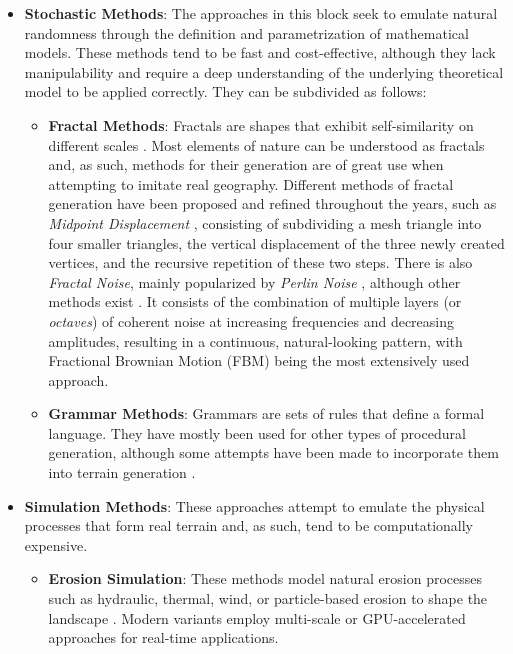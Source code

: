\begin{itemize}
    \item \textbf{Stochastic Methods}:
    The approaches in this block seek to emulate natural randomness through the definition and parametrization of mathematical models.
    These methods tend to be fast and cost-effective, although they lack manipulability and require a deep understanding of the underlying theoretical model to be applied correctly.
    They can be subdivided as follows:
    \begin{itemize}
        \item \textbf{Fractal Methods}:
        Fractals are shapes that exhibit self-similarity on different scales \cite{Mandelbrot:1983:FGN}.
        Most elements of nature can be understood as fractals and, as such, methods for their generation are of great use when attempting to imitate real geography.
        Different methods of fractal generation have been proposed and refined throughout the years, such as \textit{Midpoint Displacement} \cite{Fournier:1982:CRS} \cite{Prusinkiewicz:1993:FMM}, consisting of subdividing a mesh triangle into four smaller triangles, the vertical displacement of the three newly created vertices, and the recursive repetition of these two steps. 
        There is also \textit{Fractal Noise}, mainly popularized by \textit{Perlin Noise} \cite{Perlin:1985:IS}, although other methods exist \cite{Gustavson:2005:SND}.
        It consists of the combination of multiple layers (or \textit{octaves}) of coherent noise at increasing frequencies and decreasing amplitudes, resulting in a continuous, natural-looking pattern, with Fractional Brownian Motion (FBM) being the most extensively used approach.
        
        \item \textbf{Grammar Methods}:
        Grammars are sets of rules that define a formal language. 
        They have mostly been used for other types of procedural generation, although some attempts have been made to incorporate them into terrain generation \cite{Dey:2018:PFG}.
    \end{itemize}
    \item \textbf{Simulation Methods}:
    These approaches attempt to emulate the physical processes that form real terrain and, as such, tend to be computationally expensive.
    \begin{itemize}
        \item \textbf{Erosion Simulation}:
        These methods model natural erosion processes such as hydraulic, thermal, wind, or particle-based erosion to shape the landscape \cite{Musgrave:1989:SRE}. 
        Modern variants employ multi-scale or GPU-accelerated approaches for real-time applications.
        

\end{itemize}
\end{itemize}
